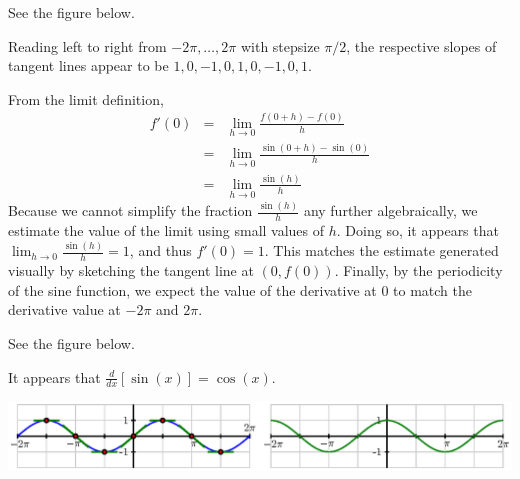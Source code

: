 \begin{activitySolution}
\ba
	\item See the figure below.
	\item Reading left to right from $-2\pi, \ldots, 2\pi$ with stepsize $\pi/2$, the respective slopes of tangent lines appear to be $1,0,-1,0,1,0,-1,0,1$.
	\item From the limit definition,
	\begin{eqnarray*}
	f'(0) & = & \lim_{h \to 0} \frac{f(0 + h) - f(0)}{h} \\
	       & = & \lim_{h \to 0} \frac{\sin(0 + h) - \sin(0)}{h} \\
	       & = & \lim_{h \to 0} \frac{\sin(h)}{h} 
	\end{eqnarray*}
	Because we cannot simplify the fraction $\frac{\sin(h)}{h}$ any further algebraically, we estimate the value of the limit using small values of $h$.  Doing so, it appears that $\lim_{h \to 0} \frac{\sin(h)}{h}  = 1$, and thus $f'(0) = 1$.  This matches the estimate generated visually by sketching the tangent line at $(0,f(0))$.  Finally, by the periodicity of the sine function, we expect the value of the derivative at 0 to match the derivative value at $-2\pi$ and $2\pi$.
	\item See the figure below.
	\item It appears that $\frac{d}{dx}[\sin(x)] = \cos(x)$.
\ea
\begin{center}
\includegraphics{figures/2_2_sineSoln.eps} %
\end{center}
\end{activitySolution}
\aftera